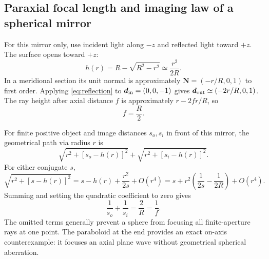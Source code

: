 \documentclass[11pt,a4paper]{article}
\numberwithin{equation}{section}
\newcommand{\vct}[1]{\bm{#1}}
\begin{document}
\subsection{Paraxial focal length and imaging law of a spherical mirror}
For this mirror only, use incident light along $-z$ and reflected light
toward $+z$. The surface opens toward $+z$:
\[
 h(r)=R-\sqrt{R^2-r^2}\simeq\frac{r^2}{2R}.
\]
In a meridional section its unit normal is approximately
$\vct N=(-r/R,0,1)$ to first order. Applying \eqref{eq:reflection} to
$\vct d_{\rm in}=(0,0,-1)$ gives
$\vct d_{\rm out}\simeq(-2r/R,0,1)$.
The ray height after axial distance $f$ is approximately
$r-2fr/R$, so
\begin{equation}
 \boxed{f=\frac R2.}
\end{equation}

For finite positive object and image distances $s_o,s_i$ in front of this
mirror, the geometrical path via radius $r$ is
\[
 \sqrt{r^2+[s_o-h(r)]^2}+\sqrt{r^2+[s_i-h(r)]^2}.
\]
For either conjugate $s$,
\[
 \sqrt{r^2+[s-h(r)]^2}
 =s-h(r)+\frac{r^2}{2s}+O(r^4)
 =s+r^2\left(\frac1{2s}-\frac1{2R}\right)+O(r^4).
\]
Summing and setting the quadratic coefficient to zero gives
\begin{equation}
 \boxed{\frac1{s_o}+\frac1{s_i}=\frac2R=\frac1f.}
\end{equation}
The omitted terms generally prevent a sphere from focusing all
finite-aperture rays at one point. The paraboloid at the end provides an
exact on-axis counterexample: it focuses an axial plane wave without
geometrical spherical aberration.
\end{document}
